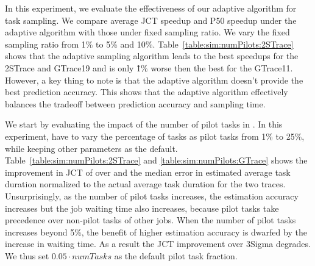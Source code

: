 \fi

In this experiment, we evaluate the effectiveness of our adaptive
algorithm for task sampling. We compare average JCT speedup and P50
speedup under the adaptive algorithm with those under fixed sampling
ratio. We vary the fixed sampling ratio from 1\% to 5\% and 10\%.
Table~\ref{table:sim:numPilots:2STrace} shows that 
the adaptive sampling algorithm leads to the best speedups for the 2STrace
and GTrace19 and is only \~1\% worse then the best for the GTrace11.
However, a key thing to note is that the adaptive algorithm doesn't
provide the best prediction accuracy. This shows that the adaptive
algorithm effectively balances the tradeoff between prediction
accuracy and sampling time.

We start by evaluating the impact of the number of pilot tasks in \slearn.  In
this experiment, have to vary the percentage of tasks as pilot tasks from 1\%
to 25\%, while keeping other parameters as the default.
Table~\ref{table:sim:numPilots:2STrace} and \ref{table:sim:numPilots:GTrace}
shows the improvement in JCT of \slearn over \primarybase and the median 
error in estimated average task duration normalized to the actual average 
task duration for the two traces.
Unsurprisingly, as the number of pilot tasks increases, the estimation accuracy
increases but
the job waiting time also increases, because pilot tasks take precedence over
non-pilot tasks of other jobs.
%
When the number of pilot tasks increases beyond 5\%, the benefit of higher
estimation accuracy is dwarfed by the increase in waiting time. As a result the
JCT improvement over 3Sigma degrades.
We thus set $0.05\cdot numTasks$ as the default pilot task fraction.
\fi



